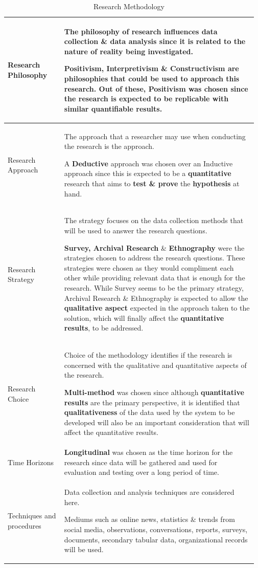 \documentclass[a4paper, 12pt, oneside]{report}
\begin{document}
\begin{longtable}{| p{0.22\linewidth} | p{0.75\linewidth}|}
\caption{Research Methodology}
\label{tab:research-methodology-table}\\
\hline
Research Philosophy  & The philosophy of research influences data collection \& data analysis since it is related to the nature of reality being investigated.

Positivism, Interpretivism \& Constructivism are philosophies that could be used to approach this research. Out of these, \textbf{Positivism} was chosen since the research is expected to be replicable with similar \textbf{quantifiable} results.
\\
\hline
Research Approach & The approach that a researcher may use when conducting the research is the approach.

A \textbf{Deductive} approach was chosen over an Inductive approach since this is expected to be a \textbf{quantitative} research that aims to \textbf{test \& prove} the \textbf{hypothesis} at hand. \\
\hline
Research Strategy  &The strategy focuses on the data collection methods that will be used to answer the research questions.

\textbf{Survey, Archival Research} \& \textbf{Ethnography} were the strategies chosen to address the research questions. These strategies were chosen as they would compliment each other while providing relevant data that is enough for the research. While Survey seems to be the primary strategy, Archival Research \& Ethnography is expected to allow the \textbf{qualitative aspect} expected in the approach taken to the solution, which will finally affect the \textbf{quantitative results}, to be addressed. \\
\hline
Research Choice & Choice of the methodology identifies if the research is concerned with the qualitative and quantitative aspects of the research.


\textbf{Multi-method} was chosen since although \textbf{quantitative results} are the primary  perspective, it is identified that \textbf{qualitativeness} of the data used by the system to be developed will also be an important consideration that will affect the quantitative results.\\
\hline
Time Horizons  & 

\textbf{Longitudinal} was chosen as the time horizon for the research since data will be gathered and used for evaluation and testing over a long period of time.\\
\hline
Techniques and procedures &  Data collection and analysis techniques are considered here.

Mediums such as online news, statistics \& trends from social media, observations, conversations, reports, surveys, documents, secondary tabular data, organizational records will be used.\\
\hline
\end{longtable}
\end{document}
